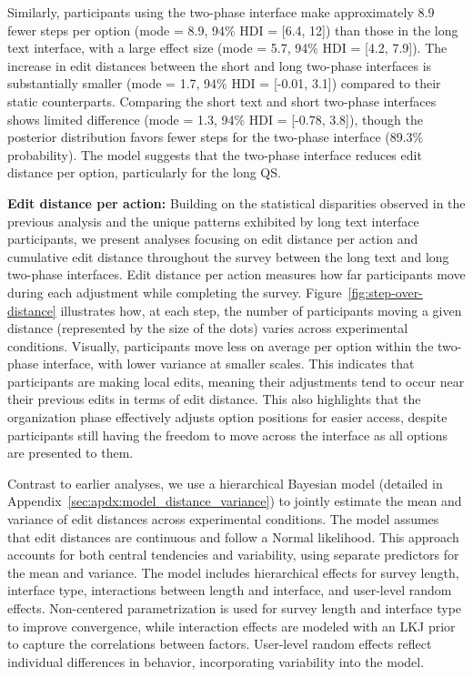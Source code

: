 Similarly, participants using the two-phase interface make approximately 8.9 fewer steps per option (mode = 8.9, 94\% HDI = [6.4, 12]) than those in the long text interface, with a large effect size (mode = 5.7, 94\% HDI = [4.2, 7.9]). The increase in edit distances between the short and long two-phase interfaces is substantially smaller (mode = 1.7, 94\% HDI = [-0.01, 3.1]) compared to their static counterparts. Comparing the short text and short two-phase interfaces shows limited difference (mode = 1.3, 94\% HDI = [-0.78, 3.8]), though the posterior distribution favors fewer steps for the two-phase interface (89.3\% probability). The model suggests that the two-phase interface reduces edit distance per option, particularly for the long QS.

\textbf{Edit distance per action:} Building on the statistical disparities observed in the previous analysis and the unique patterns exhibited by long text interface participants, we present analyses focusing on edit distance per action and cumulative edit distance throughout the survey between the long text and long two-phase interfaces. Edit distance per action measures how far participants move during each adjustment while completing the survey. Figure~\ref{fig:step-over-distance} illustrates how, at each step, the number of participants moving a given distance (represented by the size of the dots) varies across experimental conditions. Visually, participants move less on average per option within the two-phase interface, with lower variance at smaller scales. This indicates that participants are making local edits, meaning their adjustments tend to occur near their previous edits in terms of edit distance. This also highlights that the organization phase effectively adjusts option positions for easier access, despite participants still having the freedom to move across the interface as all options are presented to them.

Contrast to earlier analyses, we use a hierarchical Bayesian model (detailed in Appendix~\ref{sec:apdx:model_distance_variance}) to jointly estimate the mean and variance of edit distances across experimental conditions. The model assumes that edit distances are continuous and follow a Normal likelihood. This approach accounts for both central tendencies and variability, using separate predictors for the mean and variance. The model includes hierarchical effects for survey length, interface type, interactions between length and interface, and user-level random effects. Non-centered parametrization is used for survey length and interface type to improve convergence, while interaction effects are modeled with an LKJ prior to capture the correlations between factors. User-level random effects reflect individual differences in behavior, incorporating variability into the model.

